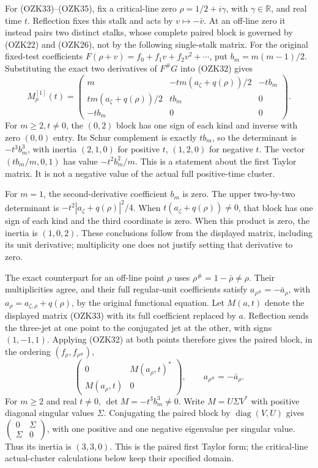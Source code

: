 \documentclass[
  10pt,
  a4paper,
]{article}
\begin{document}
For (OZK33)--(OZK35), fix a critical-line zero \(\rho=1/2+i\gamma\),
with \(\gamma\in\mathbb R\), and real time \(t\). Reflection fixes this
stalk and acts by \(v\mapsto-\bar v\). At an off-line zero it instead
pairs two distinct stalks, whose complete paired block is governed by
(OZK22) and (OZK26), not by the following single-stalk matrix. For the
original fixed-test coefficients \(F(\rho+v)=f_0+f_1v+f_2v^2+\cdots\),
put \(b_m=m(m-1)/2\). Substituting the exact two derivatives of
\(F^\#G\) into (OZK32) gives \[
M^{[1]}_\rho(t)=
\begin{pmatrix}
m&-tm(a_\zeta+q(\rho))/2&-tb_m\\
tm(a_\zeta+q(\rho))/2&tb_m&0\\
-tb_m&0&0
\end{pmatrix}.
\tag{OZK33}
\] For \(m\ge2,t\ne0\), the \((0,2)\) block has one sign of each kind
and inverse with zero \((0,0)\) entry. Its Schur complement is exactly
\(tb_m\), so the determinant is \(-t^3b_m^3\), with inertia \((2,1,0)\)
for positive \(t\), \((1,2,0)\) for negative \(t\). The vector
\((tb_m/m,0,1)\) has value \(-t^2b_m^2/m\). This is a statement about
the first Taylor matrix. It is not a negative value of the actual full
positive-time cluster.

For \(m=1\), the second-derivative coefficient \(b_m\) is zero. The
upper two-by-two determinant is \(-t^2|a_\zeta+q(\rho)|^2/4\). When
\(t(a_\zeta+q(\rho))\ne0\), that block has one sign of each kind and the
third coordinate is zero. When this product is zero, the inertia is
\((1,0,2)\). These conclusions follow from the displayed matrix,
including its unit derivative; multiplicity one does not justify setting
that derivative to zero.

The exact counterpart for an off-line point \(\rho\) uses
\(\rho^\#=1-\bar\rho\ne\rho\). Their multiplicities agree, and their
full regular-unit coefficients satisfy \(a_{\rho^\#}=-\bar a_\rho\),
with \(a_\rho=a_{\zeta,\rho}+q(\rho)\), by the original functional
equation. Let \(M(a,t)\) denote the displayed matrix (OZK33) with its
full coefficient replaced by \(a\). Reflection sends the three-jet at
one point to the conjugated jet at the other, with signs \((1,-1,1)\).
Applying (OZK32) at both points therefore gives the paired block, in the
ordering \((f_\rho,f_{\rho^\#})\), \[
\begin{pmatrix}0&M(a_\rho,t)^*\\M(a_\rho,t)&0\end{pmatrix},
\qquad a_{\rho^\#}=-\bar a_\rho.
\tag{OZK33a}
\] For \(m\ge2\) and real \(t\ne0\), \(\det M=-t^3b_m^3\ne0\). Write
\(M=U\Sigma V^*\) with positive diagonal singular values \(\Sigma\).
Conjugating the paired block by \(\operatorname{diag}(V,U)\) gives
\(\left(\begin{smallmatrix}0&\Sigma\\\Sigma&0\end{smallmatrix}\right)\),
with one positive and one negative eigenvalue per singular value. Thus
its inertia is \((3,3,0)\). This is the paired first Taylor form; the
critical-line actual-cluster calculations below keep their specified
domain.
\end{document}
